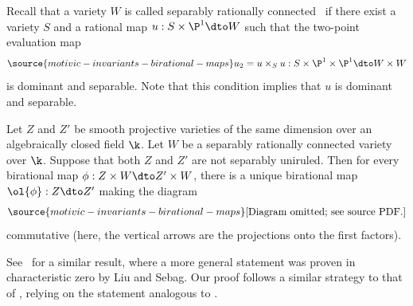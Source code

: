 Recall that a variety $W$ is called separably rationally connected~\cite[IV.3.2.3]{Kollarrat}
if there exist a variety $S$ and a rational map
$u : S \times \P^1 \dto W$ such that the two-point evaluation map
\begin{equation}\label{eq:rat-conn}
\source{motivic-invariants-birational-maps}
    u_2 = u \times_S u : S \times \P^1 \times \P^1  \dto W \times W
\end{equation}
is dominant and separable.
Note that this condition implies that $u$ is dominant
and separable.

\begin{lem}
\notready\label{lem-stbirCY}
Let $Z$ and $Z'$ be smooth projective varieties
of the same dimension
over
an algebraically closed field $\k$.
Let $W$ be a separably rationally connected variety over $\k$.
Suppose that both $Z$ and $Z'$ are not separably uniruled.
Then for
every birational map
$\phi : Z \times W \dto Z' \times W$,
there is a unique birational map
$\ol{\phi} : Z \dto Z'$ making the diagram
\begin{equation}\label{eq-ZZW}
\source{motivic-invariants-birational-maps}
    \text{[Diagram omitted; see source PDF.]}
\end{equation}
commutative \textup(here, the vertical arrows are the
projections onto the first factors\textup).
\end{lem}

See~\cite[Theorem 2]{LiuSebag} for a similar result,
where
a more general statement
was proven in characteristic zero by Liu and Sebag.
Our proof follows a similar strategy
to that of \cite[Theorem 2]{LiuSebag},
relying on the statement analogous
to \cite[Lemma 5]{LiuSebag}.



